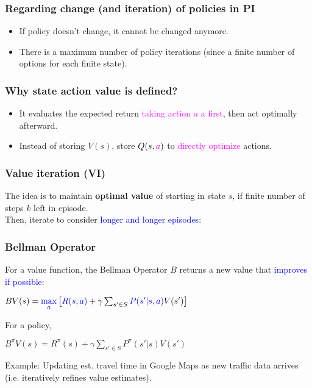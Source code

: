 \documentclass{article}
\begin{document}
\begin{hintbox}
    \subsubsection*{Regarding change (and iteration) of policies in PI}
    \begin{prfbox}
        \begin{itemize}
            \item If policy doesn't change, it cannot be changed anymore.
            \item There is a maximum number of policy iterations (since a finite number of options for each finite state).
        \end{itemize}
    \end{prfbox}
    \subsubsection*{Why state action value is defined?}
    \begin{prfbox}
        \begin{itemize}
            \item It evaluates the expected return \textcolor{magenta}{taking action $a$ a first}, then act optimally afterward.
            \item Instead of storing $V(s)$, store $Q(s, \textcolor{magenta}{a})$ to \textcolor{magenta}{directly optimize} actions.
        \end{itemize}
    \end{prfbox}
\end{hintbox}

\subsubsection{Value iteration (VI)}
The idea is to maintain \textbf{optimal value} of starting in state $s$, if finite number of steps $k$ left in episode.
\\Then, iterate to consider \textcolor{blue}{longer and longer episodes}:
\begin{defbox}
    \subsubsection*{Bellman Operator}
    For a value function, the Bellman Operator $B$ returns a new value that \textcolor{blue}{improves if possible}:
    \begin{center}
        $BV(s) = \textcolor{blue}{\mathop{\max}\limits_{a}} \left[\textcolor{blue}{R(s, a)} + \gamma \sum_{s' \in S} \textcolor{blue}{P(s' | s, a)} V(s')\right]$
    \end{center}
    For a policy,
    \begin{center}
        $B^{\pi} V(s) = R^{\pi} (s) + \gamma \sum_{s' \in S} P^{\pi} (s' | s) V(s')$
    \end{center}
    \begin{expbox}
        Example: Updating est. travel time in Google Maps as new traffic data arrives (i.e. iteratively refines value estimates).
    \end{expbox}
\end{defbox}
\end{document}
